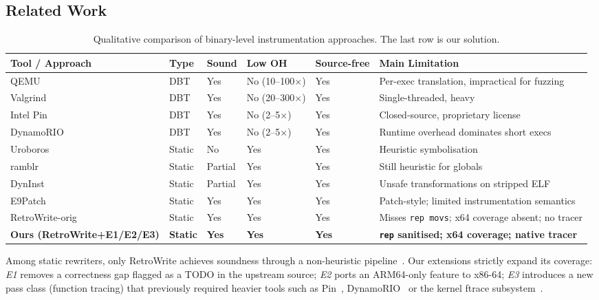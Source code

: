 \documentclass[10pt,a4paper]{article}
\begin{document}
\subsection{Related Work}

\begin{table}[H]
\centering
\caption{Qualitative comparison of binary-level instrumentation approaches.
The last row is our solution.}
\label{tab:related}
\footnotesize
\begin{tabular}{p{3cm}p{1.3cm}p{1.3cm}p{1.3cm}p{1.4cm}p{4.6cm}}
\toprule
\textbf{Tool / Approach} & \textbf{Type} & \textbf{Sound} & \textbf{Low OH}
& \textbf{Source-free} & \textbf{Main Limitation} \\
\midrule
\rowcolor{rowgray} QEMU~\cite{qemu} & DBT & Yes & No (10--100$\times$) & Yes & Per-exec translation, impractical for fuzzing \\
Valgrind~\cite{valgrind} & DBT & Yes & No (20--300$\times$) & Yes & Single-threaded, heavy \\
\rowcolor{rowgray} Intel Pin~\cite{pin} & DBT & Yes & No (2--5$\times$) & Yes & Closed-source, proprietary license \\
DynamoRIO~\cite{dynamorio} & DBT & Yes & No (2--5$\times$) & Yes & Runtime overhead dominates short execs \\
\rowcolor{rowgray} Uroboros~\cite{uroboros} & Static & \textcolor{danger}{No} & Yes & Yes & Heuristic symbolisation \\
ramblr~\cite{ramblr} & Static & \textcolor{danger}{Partial} & Yes & Yes & Still heuristic for globals \\
\rowcolor{rowgray} DynInst~\cite{dyninst} & Static & \textcolor{danger}{Partial} & Yes & Yes & Unsafe transformations on stripped ELF \\
E9Patch~\cite{e9patch} & Static & Yes & Yes & Yes & Patch-style; limited instrumentation semantics \\
\rowcolor{rowgray} RetroWrite-orig~\cite{retrowrite} & Static & Yes & Yes & Yes & Misses \texttt{rep movs}; x64 coverage absent; no tracer \\
\rowcolor{accent!15} \textbf{Ours (RetroWrite+E1/E2/E3)} & \textbf{Static} & \textbf{Yes} & \textbf{Yes} & \textbf{Yes} & \textbf{\texttt{rep} sanitised; x64 coverage; native tracer} \\
\bottomrule
\end{tabular}
\end{table}

Among static rewriters, only RetroWrite achieves soundness through a
non-heuristic pipeline~\cite{retrowrite}. Our extensions strictly expand its
coverage: \emph{E1} removes a correctness gap flagged as a TODO in the
upstream source; \emph{E2} ports an ARM64-only feature to x86-64; \emph{E3}
introduces a new pass class (function tracing) that previously required
heavier tools such as Pin~\cite{pin}, DynamoRIO~\cite{dynamorio} or the
kernel ftrace subsystem~\cite{ftrace}.
\end{document}
